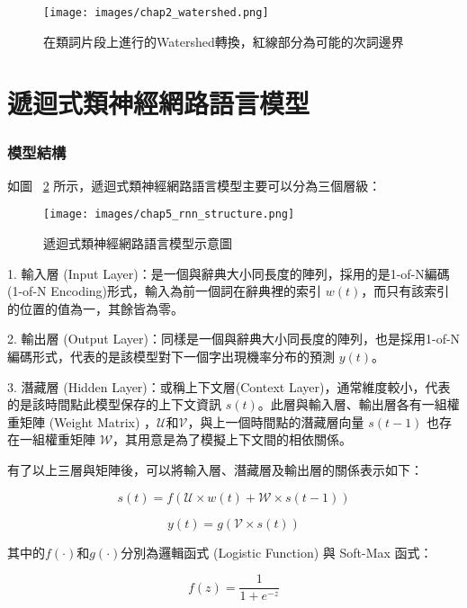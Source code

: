 \begin{figure}
\centering
\texttt{[image: images/chap2\_watershed.png]}
\caption{在類詞片段上進行的Watershed轉換，紅線部分為可能的次詞邊界} \label{fig:chap2_watershed}
\end{figure}


\section{遞迴式類神經網路語言模型}
\subsubsection{模型結構}
如圖 ~\ref{fig:chap5_rnn_structure} 所示，遞迴式類神經網路語言模型主要可以分為三個層級：
\begin{figure}
\centering
\texttt{[image: images/chap5\_rnn\_structure.png]}
\caption{遞迴式類神經網路語言模型示意圖} \label{fig:chap5_rnn_structure}
\end{figure}

1. 輸入層 (Input Layer)：是一個與辭典大小同長度的陣列，採用的是1-of-N編碼 (1-of-N Encoding)形式，輸入為前一個詞在辭典裡的索引 $w(t)$，而只有該索引的位置的值為一，其餘皆為零。

2. 輸出層 (Output Layer)：同樣是一個與辭典大小同長度的陣列，也是採用1-of-N編碼形式，代表的是該模型對下一個字出現機率分布的預測 $y(t)$。

3. 潛藏層 (Hidden Layer)：或稱上下文層(Context Layer)，通常維度較小，代表的是該時間點此模型保存的上下文資訊 $s(t)$。此層與輸入層、輸出層各有一組權重矩陣 (Weight Matrix) ，$\mathcal{U}$和$\mathcal{V}$，與上一個時間點的潛藏層向量 $s(t-1)$ 也存在一組權重矩陣 $\mathcal{W}$，其用意是為了模擬上下文間的相依關係。

有了以上三層與矩陣後，可以將輸入層、潛藏層及輸出層的關係表示如下：

\begin{equation}
s(t) = f(\mathcal{U}\times w(t) + \mathcal{W}\times s(t-1))
\end{equation}

\begin{equation}
y(t) = g(\mathcal{V}\times s(t))
\end{equation}

其中的$f(\cdot)$和$g(\cdot)$分別為邏輯函式 (Logistic Function) 與 Soft-Max 函式：

\begin{equation}
f(z) = \frac{1}{1+e^{-z}}
\end{equation}

